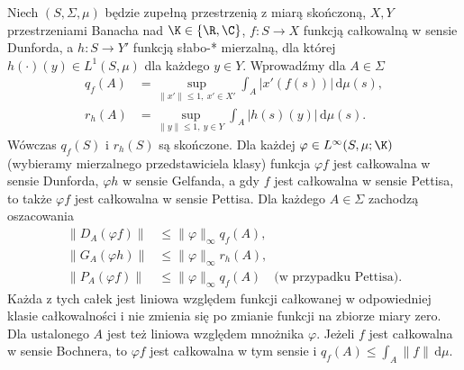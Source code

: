 \begin{twierdzenie}
\label{thm:vector-integral-multipliers15b}
Niech $(S,\Sigma,\mu)$ będzie zupełną przestrzenią z miarą
skończoną, $X,Y$ przestrzeniami Banacha nad $\K\in\{\R,\C\}$,
$f:S\to X$ funkcją całkowalną w sensie Dunforda, a
$h:S\to Y'$ funkcją słabo-* mierzalną, dla której
$h(\cdot)(y)\in L^1(S,\mu)$ dla każdego $y\in Y$.
Wprowadźmy dla $A\in\Sigma$
\[
 \begin{split}
 q_f(A)&=\sup_{\|x'\|\le1,\ x'\in X'}
       \int_A|x'(f(s))|\,\mathrm d\mu(s),\\
 r_h(A)&=\sup_{\|y\|\le1,\ y\in Y}
       \int_A|h(s)(y)|\,\mathrm d\mu(s).
 \end{split}
\]
Wówczas $q_f(S)$ i $r_h(S)$ są skończone. Dla każdej
$\varphi\in L^\infty(S,\mu;\K)$ (wybieramy mierzalnego
przedstawiciela klasy) funkcja $\varphi f$ jest
całkowalna w sensie Dunforda, $\varphi h$ w sensie Gelfanda,
a gdy $f$ jest całkowalna w sensie Pettisa, to także
$\varphi f$ jest całkowalna w sensie Pettisa. Dla każdego
$A\in\Sigma$ zachodzą oszacowania
\[
 \begin{split}
 \|D_A(\varphi f)\|&\le\|\varphi\|_\infty q_f(A),\\
 \|G_A(\varphi h)\|&\le\|\varphi\|_\infty r_h(A),\\
 \|P_A(\varphi f)\|&\le\|\varphi\|_\infty q_f(A)
       \quad\text{(w przypadku Pettisa).}
 \end{split}
\]
Każda z tych całek jest liniowa względem funkcji
całkowanej w odpowiedniej klasie całkowalności i nie zmienia
się po zmianie funkcji na zbiorze miary zero. Dla ustalonego
$A$ jest też liniowa względem mnożnika $\varphi$.
Jeżeli $f$ jest całkowalna w sensie Bochnera, to
$\varphi f$ jest całkowalna w tym sensie i
$q_f(A)\le\int_A\|f\|\,\mathrm d\mu$.
\end{twierdzenie}
